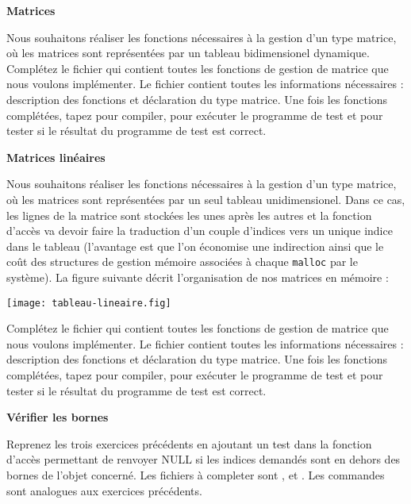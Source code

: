 \documentclass[10pt]{article}\usepackage[nu]{esial}
\begin{document}
\begin{Exercice} \textbf{Matrices}

  Nous souhaitons réaliser les fonctions nécessaires à la gestion d'un type
  matrice, où les matrices sont représentées par un tableau bidimensionel
  dynamique. Complétez le fichier  qui contient toutes les
  fonctions de gestion de matrice que nous voulons implémenter. Le fichier
   contient toutes les informations nécessaires : description
  des fonctions et déclaration du type matrice. Une fois les fonctions
  complétées, tapez  pour compiler,
   pour exécuter le programme de test et  pour tester si le résultat du programme de test est correct.
\end{Exercice}

\begin{Exercice} \textbf{Matrices linéaires} 

  Nous souhaitons réaliser les fonctions nécessaires à la gestion d'un type
  matrice, où les matrices sont représentées par un seul tableau
  unidimensionel. Dans ce cas, les lignes de la matrice sont stockées les unes
  après les autres et la fonction d'accès va devoir faire la traduction d'un
  couple d'indices vers un unique indice dans le tableau (l'avantage est que
  l'on économise une indirection ainsi que le coût des structures de gestion
  mémoire associées à chaque \texttt{malloc} par le système). La figure
  suivante décrit l'organisation de nos matrices en mémoire :

  \centerline{\texttt{[image: tableau-lineaire.fig]}}

  Complétez le fichier  qui contient toutes les
  fonctions de gestion de matrice que nous voulons implémenter. Le fichier
   contient toutes les informations nécessaires :
  description des fonctions et déclaration du type matrice. Une fois les
  fonctions complétées, tapez  pour
  compiler,  pour exécuter le programme de
  test et  pour tester si le résultat du programme de test est
  correct.
\end{Exercice}

\begin{Exercice} \textbf{Vérifier les bornes}

  Reprenez les trois exercices précédents en ajoutant un test dans la fonction
  d'accès permettant de renvoyer NULL si les indices demandés sont en dehors
  des bornes de l'objet concerné. Les fichiers à completer sont
  ,  et
  . Les commandes sont analogues aux exercices
  précédents.
\end{Exercice}
\end{document}
